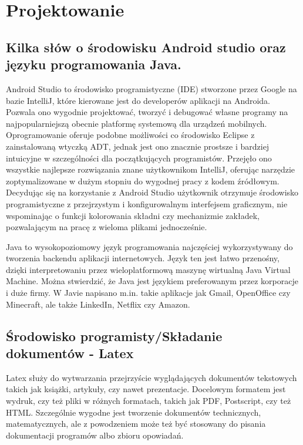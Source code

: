 \newpage
\section{Projektowanie}		%
\subsection{Kilka słów o środowisku Android studio oraz języku programowania Java.}
\hspace{0.60cm}Android Studio to środowisko programistyczne (IDE) stworzone przez Google na bazie IntelliJ, które kierowane jest do developerów aplikacji na Androida. Pozwala ono wygodnie projektować, tworzyć i debugować własne programy na najpopularniejszą obecnie platformę systemową dla urządzeń mobilnych. Oprogramowanie oferuje podobne możliwości co środowisko Eclipse z zainstalowaną wtyczką ADT, jednak jest ono znacznie prostsze i bardziej intuicyjne w szczególności dla początkujących programistów. Przejęło ono wszystkie najlepsze rozwiązania znane użytkownikom IntelliJ, oferując narzędzie zoptymalizowane w dużym stopniu do wygodnej pracy z kodem źródłowym. Decydując się na korzystanie z Android Studio użytkownik otrzymuje środowisko programistyczne z przejrzystym i konfigurowalnym interfejsem graficznym, nie wspominając o funkcji kolorowania składni czy mechanizmie zakładek, pozwalającym na pracę z wieloma plikami jednocześnie. \newline

Java to wysokopoziomowy język programowania najczęściej wykorzystywany do tworzenia backendu aplikacji internetowych. Język ten jest łatwo przenośny, dzięki interpretowaniu przez wieloplatformową maszynę wirtualną Java Virtual Machine. Można stwierdzić, że Java jest językiem preferowanym przez korporacje i duże firmy. W Javie napisano m.in. takie aplikacje jak Gmail, OpenOffice czy Minecraft, ale także LinkedIn, Netflix czy Amazon.


\subsection{Środowisko programisty/Składanie dokumentów - Latex}
\hspace{0.60cm}Latex służy do wytwarzania przejrzyście wyglądających dokumentów tekstowych takich jak książki, artykuły, czy nawet prezentacje. Docelowym formatem jest wydruk, czy też pliki w różnych formatach, takich jak PDF, Postscript, czy też HTML. Szczególnie wygodne jest tworzenie dokumentów technicznych, matematycznych, ale z powodzeniem może też być stosowany do pisania dokumentacji programów albo zbioru opowiadań.\newline

